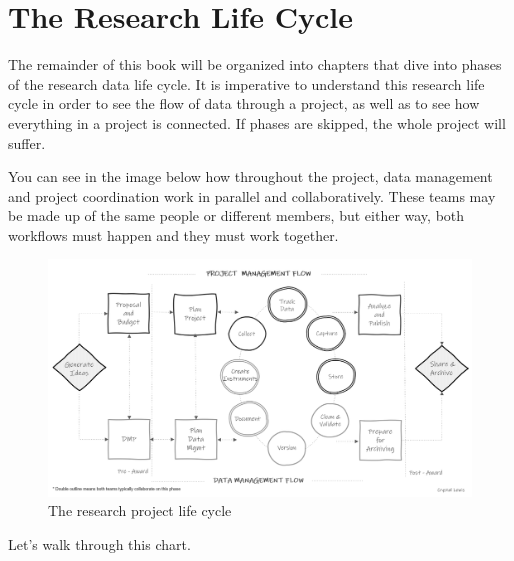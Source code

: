 \documentclass[
]{book}
\begin{document}
\hypertarget{the-research-life-cycle}{%
\section{The Research Life Cycle}\label{the-research-life-cycle}}

The remainder of this book will be organized into chapters that dive into phases of the research data life cycle. It is imperative to understand this research life cycle in order to see the flow of data through a project, as well as to see how everything in a project is connected. If phases are skipped, the whole project will suffer.

You can see in the image below how throughout the project, data management and project coordination work in parallel and collaboratively. These teams may be made up of the same people or different members, but either way, both workflows must happen and they must work together.

\begin{figure}

{\centering \includegraphics[width=1\linewidth]{img/cl_lifecycle} 

}

\caption{The research project life cycle}\label{fig:unnamed-chunk-2}
\end{figure}

Let's walk through this chart.
\end{document}
